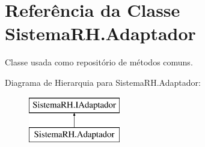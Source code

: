 \hypertarget{class_sistema_r_h_1_1_adaptador}{
\section{Referência da Classe SistemaRH.Adaptador}
\label{class_sistema_r_h_1_1_adaptador}
}


Classe usada como repositório de métodos comuns.  


Diagrama de Hierarquia para SistemaRH.Adaptador:\begin{figure}[H]
\begin{center}
\leavevmode
\includegraphics[height=2.000000cm]{class_sistema_r_h_1_1_adaptador}
\end{center}
\end{figure}
